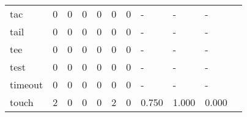 \begin{longtable}{lp{1.2cm}p{1.2cm}p{1.2cm}p{1.2cm}p{1.2cm}p{1.2cm}p{1.2cm}p{1.2cm}p{1.2cm}p{1.2cm}}
tac       &                                     0 &                                                  0 &                                                  0 &                                                  0 &                                                  0 &                                                  0 &                                                  - &                                                  - &                                                  - \\
tail      &                                     0 &                                                  0 &                                                  0 &                                                  0 &                                                  0 &                                                  0 &                                                  - &                                                  - &                                                  - \\
tee       &                                     0 &                                                  0 &                                                  0 &                                                  0 &                                                  0 &                                                  0 &                                                  - &                                                  - &                                                  - \\
test      &                                     0 &                                                  0 &                                                  0 &                                                  0 &                                                  0 &                                                  0 &                                                  - &                                                  - &                                                  - \\
timeout   &                                     0 &                                                  0 &                                                  0 &                                                  0 &                                                  0 &                                                  0 &                                                  - &                                                  - &                                                  - \\
touch     &                                     2 &                                                  0 &                                                  0 &                                                  0 &                                                  2 &                                                  0 &                                              0.750 &                                              1.000 &                                              0.000 \\

\end{longtable}
